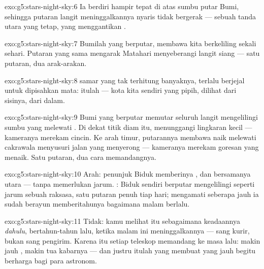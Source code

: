 \begin{solution}{exo:g5:stars-night-sky:6}
Ia berdiri hampir tepat di atas sumbu putar Bumi, sehingga putaran
langit meninggalkannya nyaris tidak bergerak --- sebuah tanda utara
yang tetap, yang menggantikan .
\end{solution}

\begin{solution}{exo:g5:stars-night-sky:7}
Bumilah yang berputar, membawa kita berkeliling sekali sehari. Putaran
yang sama mengarak Matahari menyeberangi langit siang --- satu
putaran, dua arak-arakan.
\end{solution}

\begin{solution}{exo:g5:stars-night-sky:8}
 samar yang tak terhitung banyaknya, terlalu berjejal untuk
dipisahkan mata: itulah  --- kota  kita sendiri yang
pipih, dilihat dari sisinya, dari dalam.
\end{solution}

\begin{solution}{exo:g5:stars-night-sky:9}
Bumi yang berputar memutar seluruh langit mengelilingi sumbu yang
melewati . Di dekat titik diam itu,  menunggangi
lingkaran kecil --- kameranya merekam cincin. Ke arah timur,
putarannya membawa  naik melewati cakrawala menyusuri jalan
yang menyerong --- kameranya merekam goresan yang menaik. Satu
putaran, dua cara memandangnya.
\end{solution}

\begin{solution}{exo:g5:stars-night-sky:10}
Arah: penunjuk Biduk memberinya , dan bersamanya utara
--- tanpa memerlukan jarum. : Biduk sendiri berputar mengelilingi
 seperti jarum sebuah  raksasa, satu putaran penuh
tiap hari; mengamati seberapa jauh ia sudah berayun memberitahunya
bagaimana malam berlalu.
\end{solution}

\begin{solution}{exo:g5:stars-night-sky:11}
Tidak: kamu melihat  itu sebagaimana keadaannya \emph{dahulu},
bertahun-tahun lalu, ketika  malam ini meninggalkannya --- sang
kurir, bukan sang pengirim. Karena itu setiap teleskop memandang ke
masa lalu: makin jauh , makin tua kabarnya --- dan justru
itulah yang membuat  yang jauh begitu berharga bagi para
astronom.
\end{solution}
